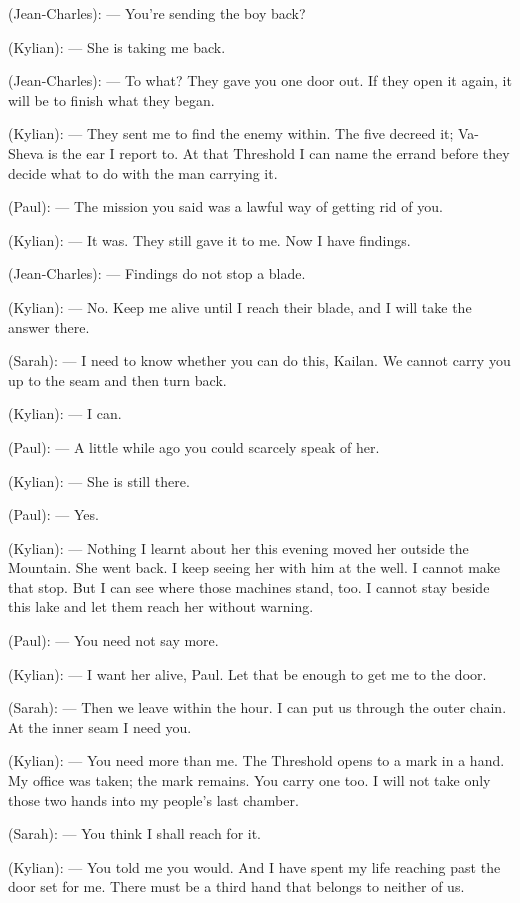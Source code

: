 \begin{room}
(Jean-Charles): --- You're sending the boy back?

(Kylian): --- She is taking me back.

(Jean-Charles): --- To what? They gave you one door out. If they open it again, it will be to finish what they began.

(Kylian): --- They sent me to find the enemy within. The five decreed it; Va-Sheva is the ear I report to. At that Threshold I can name the errand before they decide what to do with the man carrying it.

(Paul): --- The mission you said was a lawful way of getting rid of you.

(Kylian): --- It was. They still gave it to me. Now I have findings.

(Jean-Charles): --- Findings do not stop a blade.

(Kylian): --- No. Keep me alive until I reach their blade, and I will take the answer there.

(Sarah): --- I need to know whether you can do this, Kailan. We cannot carry you up to the seam and then turn back.

(Kylian): --- I can.

(Paul): --- A little while ago you could scarcely speak of her.

\centerline{}

(Kylian): --- She is still there.

(Paul): --- Yes.

(Kylian): --- Nothing I learnt about her this evening moved her outside the Mountain. She went back. I keep seeing her with him at the well. I cannot make that stop. But I can see where those machines stand, too. I cannot stay beside this lake and let them reach her without warning.

(Paul): --- You need not say more.

(Kylian): --- I want her alive, Paul. Let that be enough to get me to the door.

(Sarah): --- Then we leave within the hour. I can put us through the outer chain. At the inner seam I need you.

(Kylian): --- You need more than me. The Threshold opens to a mark in a hand. My office was taken; the mark remains. You carry one too. I will not take only those two hands into my people's last chamber.

(Sarah): --- You think I shall reach for it.

(Kylian): --- You told me you would. And I have spent my life reaching past the door set for me. There must be a third hand that belongs to neither of us.


\end{room}
